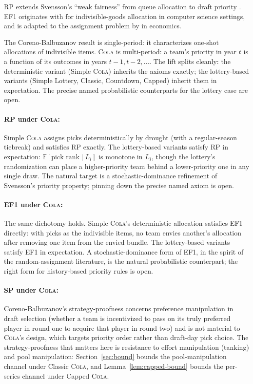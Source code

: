 \documentclass{article}
\newcommand{\cola}{\textup{\textsc{Cola}}}
\newcommand{\E}{\mathbb{E}}
\begin{document}
RP extends Svensson's ``weak fairness'' from queue allocation to draft priority \citep{svensson1994allocation}. EF1 originates with \citet{lipton2004approximately} for indivisible-goods allocation in computer science settings, and is adapted to the assignment problem by \citet{budish2011combinatorial} in economics.

The Coreno-Balbuzanov result is single-period: it characterizes one-shot allocations of indivisible items. \cola{} is multi-period: a team's priority in year $t$ is a function of its outcomes in years $t-1, t-2, \ldots$. The lift splits cleanly: the deterministic variant (Simple \cola{}) inherits the axioms exactly; the lottery-based variants (Simple Lottery, Classic, Countdown, Capped) inherit them in expectation. The precise named probabilistic counterparts for the lottery case are open.

\paragraph{RP under \cola{}:} Simple \cola{} assigns picks deterministically by drought (with a regular-season tiebreak) and satisfies RP exactly. The lottery-based variants satisfy RP in expectation: $\E[\text{pick rank} \mid L_i]$ is monotone in $L_i$, though the lottery's randomization can place a higher-priority team behind a lower-priority one in any single draw. The natural target is a stochastic-dominance refinement of Svensson's priority property; pinning down the precise named axiom is open.

\paragraph{EF1 under \cola{}:} The same dichotomy holds. Simple \cola{}'s deterministic allocation satisfies EF1 directly: with picks as the indivisible items, no team envies another's allocation after removing one item from the envied bundle. The lottery-based variants satisfy EF1 in expectation. A stochastic-dominance form of EF1, in the spirit of the random-assignment literature, is the natural probabilistic counterpart; the right form for history-based priority rules is open.

\paragraph{SP under \cola{}:} Coreno-Balbuzanov's strategy-proofness concerns preference manipulation in draft selection (whether a team is incentivized to pass on its truly preferred player in round one to acquire that player in round two) and is not material to \cola{}'s design, which targets priority order rather than draft-day pick choice. The strategy-proofness that matters here is resistance to effort manipulation (tanking) and pool manipulation: Section~\ref{sec:bound} bounds the pool-manipulation channel under Classic \cola{}, and Lemma~\ref{lem:capped-bound} bounds the per-series channel under Capped \cola{}.
\end{document}
